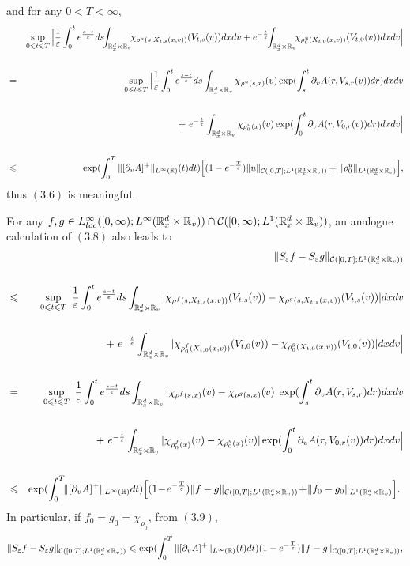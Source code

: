 \documentclass[11pt]{article}
\begin{document}
and for any $0<T<\infty$,
\begin{eqnarray}\label{3.8}
&&\sup_{0\leq t\leq T}{\Big |}
\frac{1}{\varepsilon}\int^t_0e^{\frac{s-t}
{\varepsilon}}ds\!\!\int_{\mR^d_x\times \mR_v}
\!\!\chi_{\rho^u(s,X_{t,s}(x,v))}(V_{t,s}(v))dxdv +
e^{-\frac{t}{\varepsilon}}\!\!\int_{\mR^d_x\times \mR_v}\!\!
\chi_{\rho_0^u(X_{t,0}(x,v))}(V_{t,0}(v))dxdv{\Big |} \cr \cr &=&
\sup_{0\leq t\leq T}{\Big |}
\frac{1}{\varepsilon}\int^t_0e^{\frac{s-t}
{\varepsilon}}ds\int_{\mR^d_x\times \mR_v} \chi_{\rho^u(s,x)}(v)
\exp(\int^t_s\partial_v A(r,V_{s,r}(v))dr) dxdv \cr \cr &&   + \
e^{-\frac{t}{\varepsilon}}\int_{\mR^d_x\times {\mathbb R}_v}
\chi_{\rho_0^u(x)}(v) \exp(\int^t_0\partial_v
A(r,V_{0,r}(v))dr)dxdv{\Big |} \cr \cr &\leq&
\exp(\int^T_0\|[\partial_vA]^+\|_{L^\infty(\mR)}(t)dt){\Big
[}(1-e^{-\frac{T}{\varepsilon}})\|u\|_{\cC([0,T]; L^1(\mR^d_x\times
\mR_v))}+\|\rho_0^u\|_{L^1(\mR^d_x\times \mR_v)}{\Big]},
\end{eqnarray}
thus $(3.6)$ is meaningful.
 \vskip1mm\par
For any $f,g\in L^\infty_{loc}([0,\infty);L^\infty({\mathbb R}^d_x\times
{\mathbb R}_v))\cap {\mathcal C}([0,\infty);L^1({\mathbb R}^d_x\times{\mathbb R}_v))$, an analogue
calculation of $(3.8)$ also leads to
\begin{eqnarray}\label{3.9}
 && \|S_\varepsilon f-S_\varepsilon g\|_{{\mathcal C}([0,T];
L^1({\mathbb R}^d_x\times {\mathbb R}_v))}
 \cr \cr
&\leqslant& \sup_{0\leqslant t\leqslant T}{\Big |}
\frac{1}{\varepsilon}\int^t_0e^{\frac{s-t}
{\varepsilon}}ds\int_{{\mathbb R}^d_x\times {\mathbb R}_v}
|\chi_{\rho^f(s,X_{t,s}(x,v))}(V_{t,s}(v))-
\chi_{\rho^g(s,X_{t,s}(x,v))}(V_{t,s}(v))| dxdv
 \cr \cr &&+ \
e^{-\frac{t}{\varepsilon}}\int_{{\mathbb R}^d_x\times {\mathbb R}_v}
|\chi_{\rho_0^f(X_{t,0}(x,v))}(V_{t,0}(v))-
\chi_{\rho_0^g(X_{t,0}(x,v))}(V_{t,0}(v))|dxdv{\Big |} \cr \cr &=&
\sup_{0\leqslant t\leqslant T}{\Big |}
\frac{1}{\varepsilon}\int^t_0e^{\frac{s-t}
{\varepsilon}}ds\int_{{\mathbb R}^d_x\times {\mathbb R}_v}
|\chi_{\rho^f(s,x)}(v)-\chi_{\rho^g(s,x)}(v)|
\exp(\int^t_s\partial_v A(r,V_{s,r})dr) dxdv \cr \cr && + \
e^{-\frac{t}{\varepsilon}}\int_{{\mathbb R}^d_x \times {\mathbb R}_v}
|\chi_{\rho_0^f(x)}(v)-\chi_{\rho_0^g(x)}(v) |
\exp(\int^t_0\partial_v A(r,V_{0,r}(v))dr)dxdv{\Big |} \cr \cr
&\leqslant& \exp(\int^T_0\!\!\|[\partial_vA]^+\|_{L^\infty({\mathbb R})}dt){\Big
[}(1\!-\!e^{-\frac{T}{\varepsilon}})\|f-g\|_{{\mathcal C}([0,T];
L^1({\mathbb R}^d_x\times {\mathbb R}_v))}\!+\!\|f_0-g_0\|_{L^1({\mathbb R}^d_x\times
{\mathbb R}_v)}{\Big]}. \
\end{eqnarray}
In particular, if $f_0=g_0=\chi_{\rho_0}$, from $(3.9)$,
$$
\|S_\varepsilon f-S_\varepsilon g\|_{{\mathcal C}([0,T]; L^1({\mathbb R}^d_x\times
{\mathbb R}_v))}\leqslant \exp(\int^T_0\|[\partial_vA]^+\|_{L^\infty({\mathbb R})}(t)dt)
(1-e^{-\frac{T}{\varepsilon}})\|f-g\|_{{\mathcal C}([0,T];
L^1({\mathbb R}^d_x\times {\mathbb R}_v))},
$$
\end{document}
